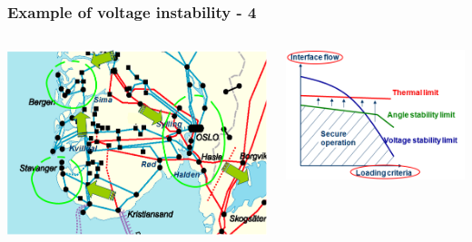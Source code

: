 \documentclass{beamer}
\begin{document}
\begin{frame}
\frametitle{Example of voltage instability - 4}
\begin{columns}
\begin{column}{0.5\textwidth}
\includegraphics[width=1\textwidth]{Figs/Hasle.png}    
\end{column}
\begin{column}{0.5\textwidth}
\includegraphics[width=1\textwidth]{Figs/SecurityLimits_emphasis.png}
\end{column}
\end{columns}  
\end{frame}
\end{document}

